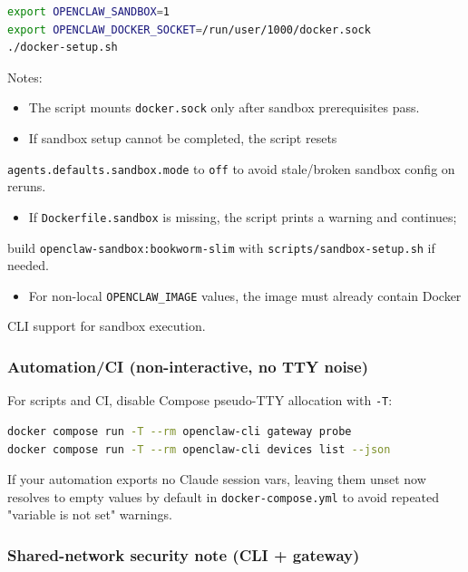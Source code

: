 \begin{lstlisting}[language=bash]
export OPENCLAW_SANDBOX=1
export OPENCLAW_DOCKER_SOCKET=/run/user/1000/docker.sock
./docker-setup.sh
\end{lstlisting}


Notes:

\begin{itemize}
  \item The script mounts \texttt{docker.sock} only after sandbox prerequisites pass.
  \item If sandbox setup cannot be completed, the script resets
\end{itemize}

\texttt{agents.defaults.sandbox.mode} to \texttt{off} to avoid stale/broken sandbox config
on reruns.
\begin{itemize}
  \item If \texttt{Dockerfile.sandbox} is missing, the script prints a warning and continues;
\end{itemize}

build \texttt{openclaw-sandbox:bookworm-slim} with \texttt{scripts/sandbox-setup.sh} if
needed.
\begin{itemize}
  \item For non-local \texttt{OPENCLAW\_IMAGE} values, the image must already contain Docker
\end{itemize}

CLI support for sandbox execution.

\subsubsection{Automation/CI (non-interactive, no TTY noise)}


For scripts and CI, disable Compose pseudo-TTY allocation with \texttt{-T}:

\begin{lstlisting}[language=bash]
docker compose run -T --rm openclaw-cli gateway probe
docker compose run -T --rm openclaw-cli devices list --json
\end{lstlisting}


If your automation exports no Claude session vars, leaving them unset now resolves to
empty values by default in \texttt{docker-compose.yml} to avoid repeated "variable is not set"
warnings.

\subsubsection{Shared-network security note (CLI + gateway)}


